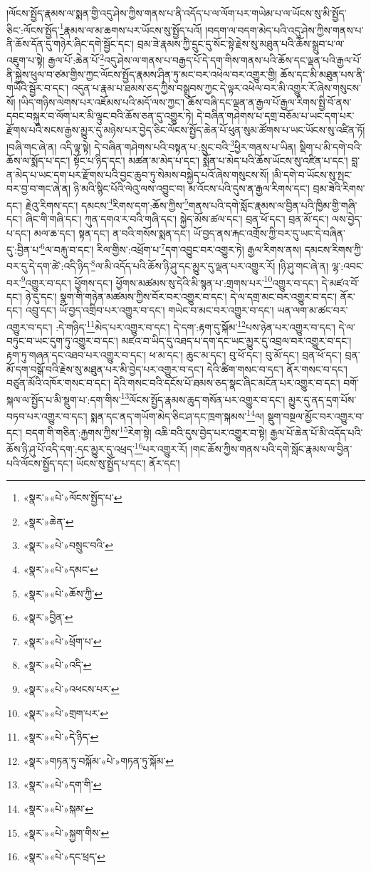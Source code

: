 །ལོངས་སྤྱོད་རྣམས་ལ་སྨན་གྱི་འདུ་ཤེས་ཀྱིས་གནས་པ་ནི་འདོད་པ་ལ་ལོག་པར་གཡེམ་པ་ལ་ཡོངས་སུ་མི་སྤྱོད་ཅིང་:ལོངས་སྤྱོད་\footnote{«སྣར་»«པེ་»ལོངས་སྤྱོད་པ་}རྣམས་ལ་མ་ཆགས་པར་ཡོངས་སུ་སྤྱོད་པའོ། །བདག་ལ་བདག་མེད་པའི་འདུ་ཤེས་ཀྱིས་གནས་པ་ནི་ཆོས་དོན་དུ་གཉེར་ཞིང་དགེ་སྦྱོང་དང་། བྲམ་ཟེ་རྣམས་ཀྱི་དྲུང་དུ་སོང་སྟེ་རྗེས་སུ་མཐུན་པའི་ཆོས་སྒྲུབ་པ་ལ་འཇུག་པ་སྟེ། རྒྱལ་པོ་:ཆེན་པོ་\footnote{«སྣར་»ཆེན་}འདུ་ཤེས་ལ་གནས་པ་བརྒྱད་པོ་དེ་དག་གིས་གནས་པའི་ཆོས་དང་ལྡན་པའི་རྒྱལ་པོ་ནི་སྐྱེས་ཕུལ་བ་ཙམ་གྱིས་ཀྱང་ལོངས་སྤྱོད་རྣམས་ཤིན་ཏུ་མང་བར་འཕེལ་བར་འགྱུར་གྱི། ཆོས་དང་མི་མཐུན་པས་ནི་གཡོའི་སྦྱོར་བ་དང་། འདུན་པ་རྣམ་པ་ཐམས་ཅད་ཀྱིས་བསྒྲུབས་ཀྱང་དེ་ལྟར་འཕེལ་བར་མི་འགྱུར་རོ་ཞེས་གསུངས་སོ། །ཡིད་གཉིས་ལེགས་པར་འཇོམས་པའི་མདོ་ལས་ཀྱང་། ཆོས་བཞི་དང་ལྡན་ན་རྒྱལ་པོ་རྒྱལ་རིགས་སྤྱི་བོ་ནས་དབང་བསྐུར་བ་ལོག་པར་མི་ལྟུང་བའི་ཆོས་ཅན་དུ་འགྱུར་ཏེ། དེ་བཞིན་གཤེགས་པ་དགྲ་བཅོམ་པ་ཡང་དག་པར་རྫོགས་པའི་སངས་རྒྱས་མྱུར་དུ་མཉེས་པར་བྱེད་ཅིང་ལོངས་སྤྱོད་ཆེན་པོ་ཕུན་སུམ་ཚོགས་པ་ཡང་ཡོངས་སུ་འཛིན་ཏོ། །བཞི་གང་ཞེ་ན། འདི་ལྟ་སྟེ། དེ་བཞིན་གཤེགས་པའི་བསྟན་པ་:སྲུང་བའི་\footnote{«སྣར་»«པེ་»བསྲུང་བའི་}ཕྱིར་གནས་པ་ཡིན། སྡིག་པ་མི་དགེ་བའི་ཆོས་ལ་སྨོད་པ་དང་། སྟོང་པ་ཉིད་དང་། མཚན་མ་མེད་པ་དང་། སྨོན་པ་མེད་པའི་ཆོས་ཡོངས་སུ་འཛིན་པ་དང་། བླ་ན་མེད་པ་ཡང་དག་པར་རྫོགས་པའི་བྱང་ཆུབ་ཏུ་སེམས་བསྐྱེད་པའོ་ཞེས་གསུངས་སོ། །མི་དགེ་བ་ཡོངས་སུ་སྤང་བར་བྱ་བ་གང་ཞེ་ན། ཉི་མའི་སྙིང་པོའི་ལེའུ་ལས་འབྱུང་བ། མ་འོངས་པའི་དུས་ན་རྒྱལ་རིགས་དང་། བྲམ་ཟེའི་རིགས་དང་། རྗེའུ་རིགས་དང་། དམངས་\footnote{«སྣར་»«པེ་»དམང་}རིགས་དག་:ཆོས་ཀྱིས་\footnote{«སྣར་»«པེ་»ཆོས་ཀྱི་}གནས་པའི་དགེ་སློང་རྣམས་ལ་བྱིན་པའི་ཁྱིམ་གྱི་གཞི་དང་། ཞིང་གི་གཞི་དང་། ཀུན་དགའ་ར་བའི་གཞི་དང་། སྐྱེད་མོས་ཚལ་དང་། བྲན་ཕོ་དང་། བྲན་མོ་དང་། ལས་བྱེད་པ་དང་། མལ་ཆ་དང་། སྟན་དང་། ན་བའི་གསོས་སྨན་དང་། ཡོ་བྱད་ནས་རྐང་འགྲོས་ཀྱི་བར་དུ་ཡང་དེ་བཞིན་དུ་:བྱིན་པ་\footnote{«སྣར་»བྱིན་}ལ་བརྐུ་བ་དང་། རིལ་གྱིས་:འཕྲོག་པ་\footnote{«སྣར་»«པེ་»ཕྲོག་པ་}དག་འབྱུང་བར་འགྱུར་ཏེ། རྒྱལ་རིགས་ནས། དམངས་རིགས་ཀྱི་བར་དུ་དེ་དག་ཚེ་:འདི་ཉིད་\footnote{«སྣར་»«པེ་»འདི་}ལ་མི་འདོད་པའི་ཆོས་ཉི་ཤུ་དང་མྱུར་དུ་ལྡན་པར་འགྱུར་རོ། །ཉི་ཤུ་གང་ཞེ་ན། ལྷ་:འབང་བར་\footnote{«སྣར་»«པེ་»འཕངས་པར་}འགྱུར་བ་དང་། ཕྱོགས་དང་། ཕྱོགས་མཚམས་སུ་དེའི་མི་སྙན་པ་:གྲགས་པར་\footnote{«སྣར་»«པེ་»གྲག་པར་}འགྱུར་བ་དང་། དེ་མཛའ་བོ་དང་། ཉེ་དུ་དང་། སྣག་གི་གཉེན་མཚམས་ཀྱིས་བོར་བར་འགྱུར་བ་དང་། དེ་ལ་དགྲ་མང་བར་འགྱུར་བ་དང་། ནོར་དང་། འབྲུ་དང་། ཡོ་བྱད་འགྲིབ་པར་འགྱུར་བ་དང་། གཡེང་བ་མང་བར་འགྱུར་བ་དང་། ཡན་ལག་མ་ཚང་བར་འགྱུར་བ་དང་། :དེ་གཉིད་\footnote{«སྣར་»«པེ་»དེ་ཉིད་}མེད་པར་འགྱུར་བ་དང་། དེ་དག་:རྟག་དུ་སྐོམ་\footnote{«སྣར་»གཏན་ཏུ་བསྐོམ་«པེ་»གཏན་ཏུ་སྐོམ་}པས་ཉེན་པར་འགྱུར་བ་དང་། དེ་ལ་བཏུང་བ་ཡང་དུག་ཏུ་འགྱུར་བ་དང་། མཛའ་བ་ཡིད་དུ་འཐད་པ་དག་དང་ཡང་མྱུར་དུ་འབྲལ་བར་འགྱུར་བ་དང་། རྟག་ཏུ་གཞན་དང་འཐབ་པར་འགྱུར་བ་དང་། ཕ་མ་དང་། ཆུང་མ་དང་། བུ་ཕོ་དང་། བུ་མོ་དང་། བྲན་ཕོ་དང་། བྲན་མོ་དག་བསྒོ་བའི་རྗེས་སུ་མཐུན་པར་མི་བྱེད་པར་འགྱུར་བ་དང་། དེའི་ཚིག་གསང་བ་དང་། ནོར་གསང་བ་དང་། བཙུན་མོའི་འཁོར་གསང་བ་དང་། དེའི་གསང་བའི་དངོས་པོ་ཐམས་ཅད་སྣང་ཞིང་མངོན་པར་འགྱུར་བ་དང་། བགོ་སྐལ་ལ་སྤྱོད་པ་མི་སྡུག་པ་:དག་གིས་\footnote{«སྣར་»«པེ་»དག་གི་}ལོངས་སྤྱོད་རྣམས་ཆུད་གསོན་པར་འགྱུར་བ་དང་། མྱུར་དུ་ནད་དྲག་པོས་བཏབ་པར་འགྱུར་བ་དང་། སྨན་དང་ནད་གཡོག་མེད་ཅིང་ཤ་དང་ཁྲག་སྐམས་\footnote{«སྣར་»«པེ་»སྐམ་}ལ། སྡུག་བསྔལ་མྱོང་བར་འགྱུར་བ་དང་། བདག་གི་གཅིན་:རྐྱགས་ཀྱིས་\footnote{«སྣར་»«པེ་»སྐྱག་གིས་}རེག་སྟེ། འཆི་བའི་དུས་བྱེད་པར་འགྱུར་བ་སྟེ། རྒྱལ་པོ་ཆེན་པོ་མི་འདོད་པའི་ཆོས་ཉི་ཤུ་པོ་འདི་དག་:དང་མྱུར་དུ་འཕྲད་\footnote{«སྣར་»«པེ་»དང་ཕྲད་}པར་འགྱུར་རོ། །གང་ཆོས་ཀྱིས་གནས་པའི་དགེ་སློང་རྣམས་ལ་བྱིན་པའི་ལོངས་སྤྱོད་དང་། ཡོངས་སུ་སྤྱོད་པ་དང་། ནོར་དང་། 